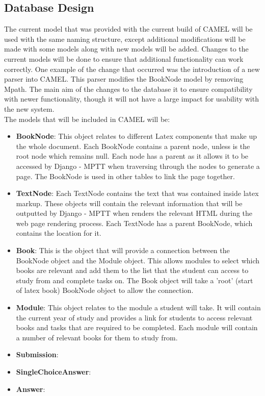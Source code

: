 \subsection{Database Design}
	The current model that was provided with the current build of CAMEL will be used with the same naming structure, except additional modifications will be made with some models along with new models will be added. Changes to the current models will be done to ensure that additional functionality can work correctly. One example of the change that occurred was the introduction of a new parser into CAMEL. This parser modifies the BookNode model by removing Mpath. The main aim of the changes to the database it to ensure compatibility with newer functionality, though it will not have a large impact for usability with the new system.\\
	
	The models that will be included in CAMEL will be:
	\begin{itemize}
		\item \textbf{BookNode}: This object relates to different Latex components that make up the whole document. Each BookNode contains a parent node, unless is the root node which remains null. Each node has a parent as it allows it to be accessed by Django - MPTT when traversing through the nodes to generate a page. The BookNode is used in other tables to link the page together.     
		
		\item \textbf{TextNode}: Each TextNode contains the text that was contained inside latex markup. These objects will contain the relevant information that will be outputted by Django - MPTT when renders the relevant HTML during the web page rendering process. Each TextNode has a parent BookNode, which contains the location for it.  
		
		\item \textbf{Book}: This is the object that will provide a connection between the BookNode object and the Module object. This allows modules to select which books are relevant and add them to the list that the student can access to study from and complete tasks on. The Book object will take a 'root' (start of latex book) BookNode object to allow the connection. 
		
		\item \textbf{Module}: This object relates to the module a student will take. It will contain the current year of study and provides a link for students to access relevant books and tasks that are required to be completed. Each module will contain a number of relevant books for them to study from.
		
		\item \textbf{Submission}:
		
		\item \textbf{SingleChoiceAnswer}:
		
		\item \textbf{Answer}:
	\end{itemize}
	

